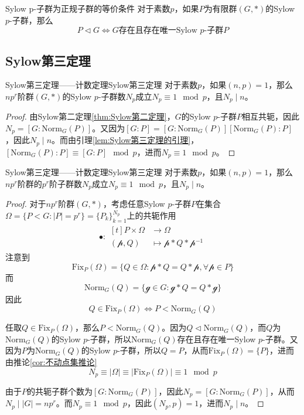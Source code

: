 \begin{corollary}{}{Sylow p-子群为正规子群的等价条件}
	对于素数$p$，如果$P$为有限群$(G,*)$的Sylow $p$-子群，那么
	$$
	P\lhd G\iff G\text{存在且存在唯一Sylow }p\text{-子群}P
	$$
\end{corollary}

\subsection{Sylow第三定理}

\begin{theorem}{Sylow第三定理——计数定理}{Sylow第三定理}
	对于素数$p$，如果$(n,p)=1$，那么$np^r$阶群$(G,*)$的Sylow $p$-子群数$N_p$成立$N_p\equiv 1\mod p$，且$N_p\mid n$。
\end{theorem}

\begin{proof}
	由Sylow第二定理\ref{thm:Sylow第二定理}，$G$的Sylow $p$-子群$P$相互共轭，因此$N_p=[G:\mathrm{Norm}_G(P)]$。又因为$[G:P]=[G:\mathrm{Norm}_G(P)][\mathrm{Norm}_G(P):P]$，因此$N_p\mid n$。而由引理\ref{lem:Sylow第三定理的引理}，$[\mathrm{Norm}_G(P):P]\equiv [G:P]\mod p$，进而$N_p\equiv 1\mod p$。
\end{proof}

\begin{theorem}{Sylow第三定理——计数定理}{Sylow第三定理}
	对于素数$p$，如果$(n,p)=1$，那么$np^r$阶群的$p^r$阶子群数$N_p$成立$N_p\equiv 1\mod p$，且$N_p\mid n$。
\end{theorem}

\begin{proof}
	对于$np^r$阶群$(G,*)$，考虑任意Sylow $p$-子群$P$在集合$\Omega=\{ P<G:|P|=p^r \}=\{ P_k \}_{k=1}^{N_p}$上的共轭作用
	\begin{align*}
		\bullet:\begin{aligned}[t]
			P\times \Omega&\longrightarrow\Omega\\
			(\mathcal{p},Q)&\longmapsto \mathcal{p}*Q*\mathcal{p}^{-1}
		\end{aligned}
	\end{align*}
	注意到
	$$
	\mathrm{Fix}_{P}(\Omega)=\{ Q\in\Omega:\mathcal{p}*Q=Q*\mathcal{p},\forall \mathcal{p}\in P \}
	$$
	而
	$$
	\mathrm{Norm}_G(Q)=\{ \mathcal{g}\in G:\mathcal{g}*Q=Q*\mathcal{g} \}
	$$
	因此
	$$
	Q\in\mathrm{Fix}_P(\Omega)\iff P<\mathrm{Norm}_G(Q)
	$$
	
	任取$Q\in\mathrm{Fix}_P(\Omega)$，那么$P<\mathrm{Norm}_G(Q)$。因为$Q\lhd \mathrm{Norm}_G(Q)$，而$Q$为$\mathrm{Norm}_G(Q)$的Sylow $p$-子群，所以$\mathrm{Norm}_G(Q)$存在且存在唯一Sylow $p$-子群。又因为$P$为$\mathrm{Norm}_G(Q)$的Sylow $p$-子群，所以$Q=P$，从而$\mathrm{Fix}_P(\Omega)=\{P\}$，进而由推论\ref{cor:不动点集推论}
	$$
	N_p\equiv |\Omega|\equiv |\mathrm{Fix}_P(\Omega)|\equiv 1\mod p
	$$
	
	由于$P$的共轭子群个数为$[G:\mathrm{Norm}_G(P)]$，因此$N_p=[G:\mathrm{Norm}_G(P)]$，从而$N_p\mid |G|=np^r$。而$N_p\equiv 1\mod p$，因此$(N_p,p)=1$，进而$N_p\mid n$。
\end{proof}

